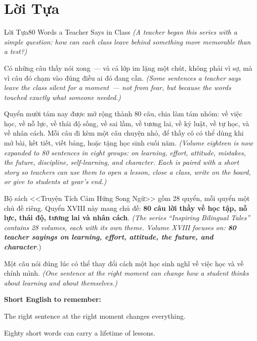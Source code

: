 \chapter*{Lời Tựa}

\begin{truyen}{Lời Tựa}{80 Words a Teacher Says in Class}
\textit{(A teacher began this series with a simple question: how can each class leave behind something more memorable than a test?)}

Có những câu thầy nói xong~--- và cả lớp im lặng một chút, không phải vì sợ, mà vì câu đó chạm vào đúng điều ai đó đang cần.
\textit{(Some sentences a teacher says leave the class silent for a moment~--- not from fear, but because the words touched exactly what someone needed.)}

Quyển mười tám nay được mở rộng thành 80 câu, chia làm tám nhóm: về việc học, về nỗ lực, về thái độ sống, về sai lầm, về tương lai, về kỷ luật, về tự học, và về nhân cách. Mỗi câu đi kèm một câu chuyện nhỏ, để thầy cô có thể dùng khi mở bài, kết tiết, viết bảng, hoặc tặng học sinh cuối năm.
\textit{(Volume eighteen is now expanded to 80 sentences in eight groups: on learning, effort, attitude, mistakes, the future, discipline, self-learning, and character. Each is paired with a short story so teachers can use them to open a lesson, close a class, write on the board, or give to students at year's end.)}

Bộ sách <<Truyện Tích Cảm Hứng Song Ngữ>> gồm 28 quyển, mỗi quyển một chủ đề riêng. Quyển XVIII này mang chủ đề: \textbf{80 câu lời thầy về học tập, nỗ lực, thái độ, tương lai và nhân cách}.
\textit{(The series ``Inspiring Bilingual Tales'' contains 28 volumes, each with its own theme. Volume XVIII focuses on: \textbf{80 teacher sayings on learning, effort, attitude, the future, and character}.})
\end{truyen}

\begin{baihoc}
Một câu nói đúng lúc có thể thay đổi cách một học sinh nghĩ về việc học và về chính mình.
\textit{(One sentence at the right moment can change how a student thinks about learning and about themselves.)}
\end{baihoc}

\begin{ghinhoanh}
\textbf{Short English to remember:}

The right sentence at the right moment changes everything.

Eighty short words can carry a lifetime of lessons.
\end{ghinhoanh}

